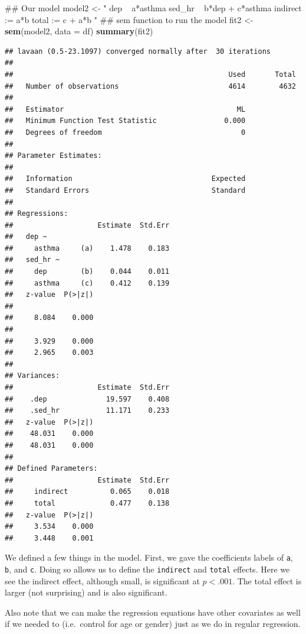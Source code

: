 \documentclass[]{tufte-book}
\newenvironment{Shaded}{}{}
\newcommand{\KeywordTok}[1]{\textcolor[rgb]{0.00,0.44,0.13}{\textbf{#1}}}
\newcommand{\DataTypeTok}[1]{\textcolor[rgb]{0.56,0.13,0.00}{#1}}
\newcommand{\StringTok}[1]{\textcolor[rgb]{0.25,0.44,0.63}{#1}}
\newcommand{\NormalTok}[1]{#1}
\theoremstyle{definition}
\theoremstyle{definition}
\theoremstyle{remark}
\begin{document}
\begin{Shaded}
\begin{Highlighting}[]
\NormalTok{## Our model}
\NormalTok{model2 <-}\StringTok{ "}
\StringTok{  dep ~ a*asthma}
\StringTok{  sed_hr ~ b*dep + c*asthma}
\StringTok{ }
\StringTok{  indirect := a*b}
\StringTok{  total := c + a*b}
\StringTok{"}
\NormalTok{## sem function to run the model}
\NormalTok{fit2 <-}\StringTok{ }\KeywordTok{sem}\NormalTok{(model2, }\DataTypeTok{data =}\NormalTok{ df)}
\KeywordTok{summary}\NormalTok{(fit2)}
\end{Highlighting}
\end{Shaded}

\begin{verbatim}
## lavaan (0.5-23.1097) converged normally after  30 iterations
## 
##                                                   Used       Total
##   Number of observations                          4614        4632
## 
##   Estimator                                         ML
##   Minimum Function Test Statistic                0.000
##   Degrees of freedom                                 0
## 
## Parameter Estimates:
## 
##   Information                                 Expected
##   Standard Errors                             Standard
## 
## Regressions:
##                    Estimate  Std.Err
##   dep ~                             
##     asthma     (a)    1.478    0.183
##   sed_hr ~                          
##     dep        (b)    0.044    0.011
##     asthma     (c)    0.412    0.139
##   z-value  P(>|z|)
##                   
##     8.084    0.000
##                   
##     3.929    0.000
##     2.965    0.003
## 
## Variances:
##                    Estimate  Std.Err
##    .dep              19.597    0.408
##    .sed_hr           11.171    0.233
##   z-value  P(>|z|)
##    48.031    0.000
##    48.031    0.000
## 
## Defined Parameters:
##                    Estimate  Std.Err
##     indirect          0.065    0.018
##     total             0.477    0.138
##   z-value  P(>|z|)
##     3.534    0.000
##     3.448    0.001
\end{verbatim}

We defined a few things in the model. First, we gave the coefficients
labels of \texttt{a}, \texttt{b}, and \texttt{c}. Doing so allows us to
define the \texttt{indirect} and \texttt{total} effects. Here we see the
indirect effect, although small, is significant at \(p < .001\). The
total effect is larger (not surprising) and is also significant.

Also note that we can make the regression equations have other
covariates as well if we needed to (i.e.~control for age or gender) just
as we do in regular regression.
\end{document}
